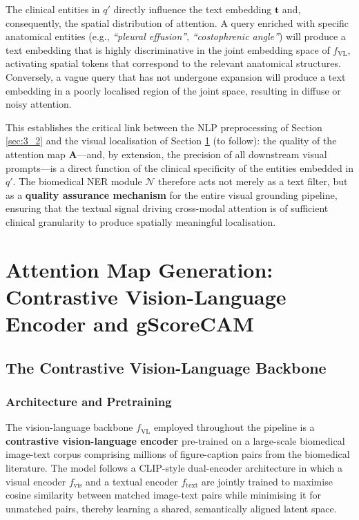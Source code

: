 The clinical entities in $q'$ directly influence the text embedding $\mathbf{t}$ and, consequently, the spatial distribution of attention. A query enriched with specific anatomical entities (e.g., \textit{``pleural effusion''}, \textit{``costophrenic angle''}) will produce a text embedding that is highly discriminative in the joint embedding space of $f_{\text{VL}}$, activating spatial tokens that correspond to the relevant anatomical structures. Conversely, a vague query that has not undergone expansion will produce a text embedding in a poorly localised region of the joint space, resulting in diffuse or noisy attention.

This establishes the critical link between the NLP preprocessing of Section \ref{sec:3_2} and the visual localisation of Section \ref{sec:3_3} (to follow): the quality of the attention map $\mathbf{A}$---and, by extension, the precision of all downstream visual prompts---is a direct function of the clinical specificity of the entities embedded in $q'$. The biomedical NER module $\mathcal{N}$ therefore acts not merely as a text filter, but as a \textbf{quality assurance mechanism} for the entire visual grounding pipeline, ensuring that the textual signal driving cross-modal attention is of sufficient clinical granularity to produce spatially meaningful localisation.

\section{Attention Map Generation: Contrastive Vision-Language Encoder and gScoreCAM}
\label{sec:3_3}
\subsection{The Contrastive Vision-Language Backbone}
\label{sec:3_3_1}

\subsubsection{Architecture and Pretraining}
\label{sec:3_3_1_1}

The vision-language backbone $f_{\text{VL}}$ employed throughout the pipeline is a \textbf{contrastive vision-language encoder} pre-trained on a large-scale biomedical image-text corpus comprising millions of figure-caption pairs from the biomedical literature. The model follows a CLIP-style dual-encoder architecture in which a visual encoder $f_{\text{vis}}$ and a textual encoder $f_{\text{text}}$ are jointly trained to maximise cosine similarity between matched image-text pairs while minimising it for unmatched pairs, thereby learning a shared, semantically aligned latent space.


